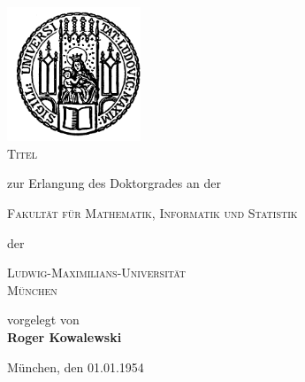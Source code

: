 
\begin{titlepage}
	\begin{center}
        \includegraphics[width=0.3\textwidth]{Styles/lmu_siegel}\\
        \vskip 1cm
		\textsc{\huge Titel}
                \vskip 1cm
                \begin{large}
                  zur Erlangung des Doktorgrades an der\\[0.50cm]
                  \begin{Large}
                    \textsc{Fakultät für Mathematik, Informatik und Statistik}\\[0.50cm]
                  \end{Large}
                  der\\[0.50cm]
                  \begin{Large}
                    \textsc{Ludwig-Maximilians-Universität\\München}\par
                  \end{Large}
                \end{large}
		\vfill
                {\large vorgelegt von}\\[0.5cm]
                {\LARGE \bfseries Roger Kowalewski}
    \vskip 1cm
    \begin{small}
        München, den 01.01.1954
    \end{small}
	\end{center}
\end{titlepage}


